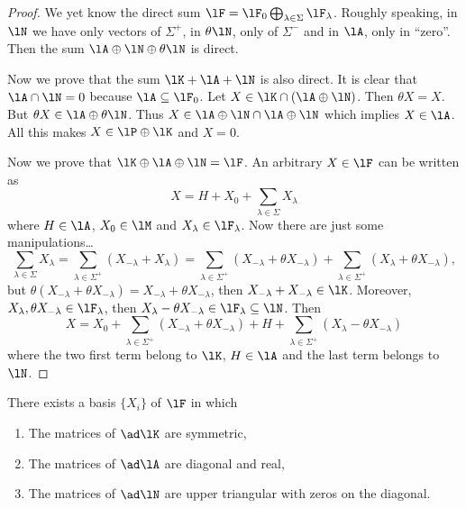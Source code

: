 \begin{proof}
We yet know the direct sum $\lF=\lF_0\bigoplus_{\lambda\in\Sigma}\lF_{\lambda}$. Roughly speaking, in $\lN$ we have only vectors of $\Sigma^+$, in $\theta\lN$, only of $\Sigma^-$ and in $\lA$, only in ``zero''. Then the sum $\lA\oplus\lN\oplus\theta\lN$ is direct.

Now we prove that the sum $\lK+\lA+\lN$ is also direct. It is clear that $\lA\cap\lN=0$ because $\lA\subseteq\lF_0$. Let $X\in\lK\cap(\lA\oplus\lN)$. Then $\theta X=X$. But $\theta X\in\lA\oplus\theta\lN$. Thus $X\in\lA\oplus\lN\cap\lA\oplus\lN$ which implies $X\in\lA$. All this makes $X\in\lP\oplus\lK$ and $X=0$.

Now we prove that $\lK\oplus\lA\oplus\lN=\lF$. An arbitrary $X\in\lF$ can be written as 
\[
   X=H+X_0+\sum_{\lambda\in\Sigma}X_{\lambda}
\]
where $H\in\lA$, $X_0\in\lM$ and $X_{\lambda}\in\lF_{\lambda}$. Now there are just some manipulations\ldots
\begin{equation}
  \sum_{\lambda\in\Sigma}X_{\lambda}=\sum_{\lambda\in\Sigma^+}(X_{-\lambda}+X_{\lambda})
                                  =\sum_{\lambda\in\Sigma^+}(X_{-\lambda}+\theta X_{-\lambda})
                  +\sum_{\lambda\in\Sigma^+}(X_{\lambda}+\theta X_{-\lambda}),
\end{equation}
but $\theta(X_{-\lambda}+\theta X_{-\lambda})=X_{-\lambda}+\theta X_{-\lambda}$, then $X_{-\lambda}+X_{-\lambda}\in\lK$. Moreover, $X_{\lambda}, \theta X_{-\lambda}\in\lF_{\lambda}$, then $X_{\lambda}-\theta X_{-\lambda}\in\lF_{\lambda}\subseteq\lN$. Then
\begin{equation}
  X=X_0+\sum_{\lambda\in\Sigma^+}(X_{-\lambda}+\theta X_{-\lambda})+H+\sum_{\lambda\in\Sigma^+}(X_{\lambda}-\theta X_{-\lambda})
\end{equation}
where the two first term belong to $\lK$, $H\in\lA$ and the last term belongs to $\lN$.
\end{proof}

\begin{lemma}
There exists a basis $\{X_i\}$ of $\lF$ in which 

\begin{enumerate}
\item\label{enudi} The matrices of $\ad\lK$ are symmetric,
\item\label{enudii} The matrices of $\ad\lA$ are diagonal and real,
\item\label{enudiii} The matrices of $\ad\lN$ are upper triangular with zeros on the diagonal.
\end{enumerate}
\end{lemma}

